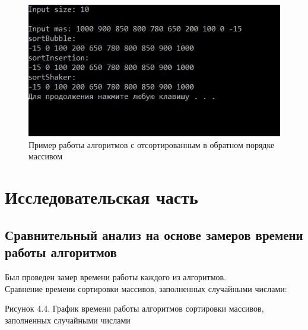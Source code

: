 \documentclass[12pt]{report}
\begin{document}
\begin{figure}[!htbp]
\centering
\includegraphics[width=1\linewidth]{example3.jpg}
\caption{Пример работы алгоритмов с отсортированным в обратном порядке массивом}
\label{fig:mpr}
\end{figure}




\chapter{Исследовательская часть}

\section{Сравнительный анализ на основе замеров времени работы алгоритмов}

Был проведен замер времени работы каждого из алгоритмов.\\

Сравнение времени сортировки массивов, заполненных случайными числами: \\


\begin{center}
  	Рисунок 4.4. График времени работы алгоритмов сортировки массивов, заполненных случайными числами
	\end{center}
	
\end{document}
